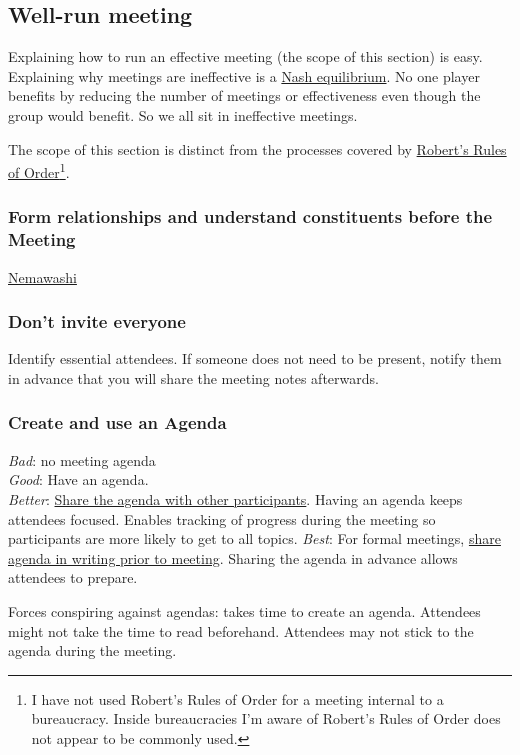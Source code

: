\subsection{Well-run meeting\label{well-run_meeting}}

Explaining how to run an effective meeting (the scope of this section) is easy. Explaining why meetings are ineffective is a \href{https://en.wikipedia.org/wiki/Nash_equilibrium}{Nash equilibrium}. No one player benefits by reducing the number of meetings or effectiveness even though the group would benefit. So we all sit in ineffective meetings. 

The scope of this section is distinct from the processes covered by \href{https://en.wikipedia.org/wiki/Robert\%27s_Rules_of_Order}{Robert's Rules of Order}\footnote{I have not used Robert's Rules of Order for a meeting internal to a bureaucracy. Inside bureaucracies I'm aware of Robert's Rules of Order does not appear to be commonly used.}. 

\subsubsection{Form relationships and understand constituents before the Meeting}

\href{https://en.wikipedia.org/wiki/Nemawashi}{Nemawashi}

\subsubsection{Don't invite everyone}
Identify essential attendees. If someone does not need to be present, notify them in advance that you will share the meeting notes afterwards. 

\subsubsection{Create and use an Agenda}
\textit{Bad}: no meeting agenda\\
\textit{Good}: Have an agenda. \\
\textit{Better}: \underline{Share the agenda with other participants}. Having an agenda keeps attendees focused.  Enables tracking of progress during the meeting so participants are more likely to get to all topics.
\textit{Best}: For formal meetings, \underline{share agenda in writing prior to meeting}. Sharing the agenda in advance allows attendees to prepare.

Forces conspiring against agendas: takes time to create an agenda. Attendees might not take the time to read beforehand. Attendees may not stick to the agenda during the meeting.

